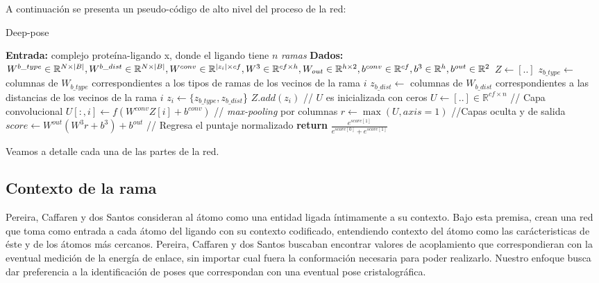 A continuación se presenta un pseudo-código de alto nivel del proceso
de la red:
\newpage
\begin{algorithm}[H]
  \caption{Deep-pose}
  \begin{algorithmic}[1]
    \State \textbf{Entrada:} complejo proteína-ligando x,
    donde el ligando tiene $n$ \textit{ramas}
    \State \textbf{Dados:}\newline
                           $W^{b\_type} \in \mathbb{R}^{N\times |B|}, W^{b\_dist}
                           \in \mathbb{R}^{N\times |B|},\newline
                           W^{conv} \in \mathbb{R}^{|z_i| \times cf}, W^3 \in
                           \mathbb{R}^{cf \times h},\newline
                           W_{out} \in \mathbb{R}^{h \times 2},\newline
                           b^{conv} \in \mathbb{R}^{cf}, b^{3} \in
                           \mathbb{R}^{h},\newline
                           b^{out} \in \mathbb{R}^{2}$
    \State $Z \gets [..]$
      \State $z_{b\_type} \gets$ columnas de $W_{b\_type}$
      correspondientes a los tipos de ramas de los vecinos de la
      rama $i$
      \State $z_{b\_dist} \gets$  columnas de $W_{b\_dist}$
      correspondientes a las distancias de los vecinos de la rama $i$
      \State $z_i \gets \{z_{b\_type}, z_{b\_dist}$\}
      \State $Z.add(z_i)$
    \EndFor
    \State // $U$ es inicializada con ceros
    \State $U \gets [..] \in \mathbb{R}^{cf \times n}$
    \State // Capa convolucional
      \State $U[:,i]\gets f(W^{conv}Z[i] + b^{conv})$
    \EndFor
    \State // \textit{max-pooling} por columnas
    \State $r\gets \max(U, axis=1)$
    \State //Capas oculta y de salida
    \State $score\gets W^{out}(W^3r + b^3) + b^{out}$
    \State // Regresa el puntaje normalizado
    \State \textbf{return} $\frac{e^{score[1]}}{e^{score[0]}+e^{score[1]}}$
  \end{algorithmic}
\end{algorithm}
Veamos a detalle cada una de las partes de la red.

\subsection{Contexto de la rama}
Pereira, Caffaren y dos Santos \cite{dossantos} consideran al átomo
como una entidad ligada íntimamente a su contexto. Bajo esta premisa,
crean una red que toma como entrada a cada átomo del ligando con su
contexto codificado, entendiendo contexto del átomo como las
carácteristicas de éste y de los átomos más cercanos.  Pereira,
Caffaren y dos Santos buscaban encontrar valores de acoplamiento que
correspondieran con la eventual medición de la energía de enlace, sin
importar cual fuera la conformación necesaria para poder realizarlo.
Nuestro enfoque busca dar preferencia a la identificación de poses
que correspondan con una eventual pose cristalográfica.

